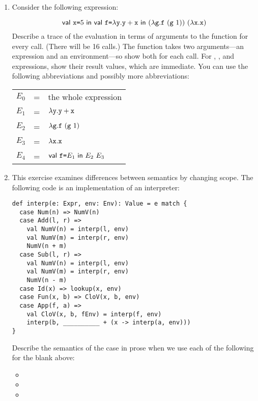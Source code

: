 \begin{enumerate}
\item Consider the following expression:

\[
\ebind{\cx}{5}{
    \ebind{\code{f}}{\efun{\cy}{\eadd{\cy}{\cx}}}{
        \eapp{(\efun{\code{g}}{\eapp{\code{f}}{(\eapp{\code{g}}{1})}})}
        {(\efun{\cx}{\cx})}
    }
}
\]
Describe a trace of the evaluation in terms of arguments to the 
function for every call. (There will be 16 calls.) The  function
takes two arguments---an expression and an environment---so show both for each call.
For , , and  expressions, show their result values, which
are immediate. You can use the following abbreviations and possibly more abbreviations:

\begin{center}
\begin{tabular}{lcl}
$E_0$ & = & the whole expression \\
$E_1$ & = & $\lambda\texttt{y}.\texttt{y}+\texttt{x}$ \\
$E_2$ & = & $\lambda\texttt{g}.\texttt{f}\ (\texttt{g}\ 1)$ \\
$E_3$ & = & $\lambda\texttt{x}.\texttt{x}$ \\
$E_4$ & = & $\textsf{val}\ \texttt{f}\texttt{=} E_1\ \textsf{in}\ E_2\ E_3$
\end{tabular}
\end{center}

\item This exercise examines differences between semantics by changing scope.
The following code is an implementation of an interpreter:

\begin{verbatim}
def interp(e: Expr, env: Env): Value = e match {
  case Num(n) => NumV(n)
  case Add(l, r) =>
    val NumV(n) = interp(l, env)
    val NumV(m) = interp(r, env)
    NumV(n + m)
  case Sub(l, r) =>
    val NumV(n) = interp(l, env)
    val NumV(m) = interp(r, env)
    NumV(n - m)
  case Id(x) => lookup(x, env)
  case Fun(x, b) => CloV(x, b, env)
  case App(f, a) =>
    val CloV(x, b, fEnv) = interp(f, env)
    interp(b, __________ + (x -> interp(a, env)))
}
\end{verbatim}

Describe the semantics of the  case in prose
when we use each of the following for the blank above:
\begin{itemize}
  \item {}
  \item {}
  \item {}
\end{itemize}


\end{enumerate}
